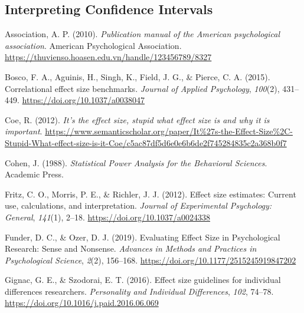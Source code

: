 \documentclass[
  man,
  colorlinks=true,linkcolor=blue,citecolor=blue,urlcolor=blue]{apa7}
\newlength{\cslhangindent}
\newlength{\cslentryspacingunit} %
\newenvironment{CSLReferences}[2] %
 {%
  \setlength{\parindent}{0pt}
  \ifodd #1
  \let\oldpar\par
  \def\par{\hangindent=\cslhangindent\oldpar}
  \fi
  \setlength{\parskip}{#2\cslentryspacingunit}
 }%
 {}
\begin{document}
\hypertarget{interpreting-confidence-intervals}{%
\subsection*{Interpreting Confidence
Intervals}\label{interpreting-confidence-intervals}}

\hypertarget{refs}{}
\begin{CSLReferences}{1}{0}
\leavevmode{}%
Association, A. P. (2010). \emph{Publication manual of the American
psychological association}. American Psychological Association.
\url{https://thuvienso.hoasen.edu.vn/handle/123456789/8327}

\leavevmode{}%
Bosco, F. A., Aguinis, H., Singh, K., Field, J. G., \& Pierce, C. A.
(2015). Correlational effect size benchmarks. \emph{Journal of Applied
Psychology}, \emph{100}(2), 431--449.
\url{https://doi.org/10.1037/a0038047}

\leavevmode{}%
Coe, R. (2012). \emph{It's the effect size, stupid what effect size is
and why it is important}.
\url{https://www.semanticscholar.org/paper/It\%27s-the-Effect-Size\%2C-Stupid-What-effect-size-is-it-Coe/c5ac87df5d6e0e6b6de2f745284835c2a368b0f7}

\leavevmode{}%
Cohen, J. (1988). \emph{Statistical Power Analysis for the Behavioral
Sciences}. Academic Press.

\leavevmode{}%
Fritz, C. O., Morris, P. E., \& Richler, J. J. (2012). Effect size
estimates: Current use, calculations, and interpretation. \emph{Journal
of Experimental Psychology: General}, \emph{141}(1), 2--18.
\url{https://doi.org/10.1037/a0024338}

\leavevmode{}%
Funder, D. C., \& Ozer, D. J. (2019). Evaluating Effect Size in
Psychological Research: Sense and Nonsense. \emph{Advances in Methods
and Practices in Psychological Science}, \emph{2}(2), 156--168.
\url{https://doi.org/10.1177/2515245919847202}

\leavevmode{}%
Gignac, G. E., \& Szodorai, E. T. (2016). Effect size guidelines for
individual differences researchers. \emph{Personality and Individual
Differences}, \emph{102}, 74--78.
\url{https://doi.org/10.1016/j.paid.2016.06.069}


\end{CSLReferences}
\end{document}

